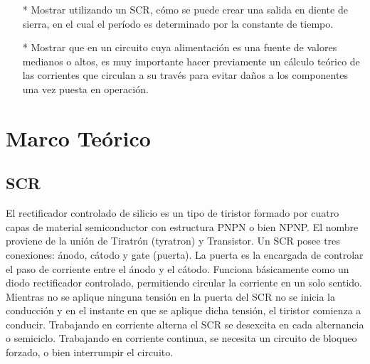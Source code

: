\documentclass[osajnl,twocolumn,showpacs,superscriptaddress,10pt]{revtex4-1}
\begin{document}
\begin{itemize}
    \item[*] Mostrar utilizando un SCR, cómo se puede crear una salida en diente de sierra, en el cual el período es determinado por la constante de tiempo.
    
    \item[*] Mostrar que en un circuito cuya alimentación es una fuente de valores medianos o altos, es muy importante hacer previamente un cálculo teórico de las corrientes que circulan a su través para evitar daños a los componentes una vez puesta en operación.
\end{itemize}
 
 
\section{Marco Teórico}

    
\subsection{SCR}

El rectificador controlado de silicio es un tipo de tiristor formado por cuatro capas de material semiconductor con estructura PNPN o bien NPNP. El nombre proviene de la unión de Tiratrón (tyratron) y Transistor. Un SCR posee tres conexiones: ánodo, cátodo y gate (puerta). La puerta es la encargada de controlar el paso de corriente entre el ánodo y el cátodo. Funciona básicamente como un diodo rectificador controlado, permitiendo circular la corriente en un solo sentido. Mientras no se aplique ninguna tensión en la puerta del SCR no se inicia la conducción y en el instante en que se aplique dicha tensión, el tiristor comienza a conducir. Trabajando en corriente alterna el SCR se desexcita en cada alternancia o semiciclo. Trabajando en corriente continua, se necesita un circuito de bloqueo forzado, o bien interrumpir el circuito.\\
\end{document}
